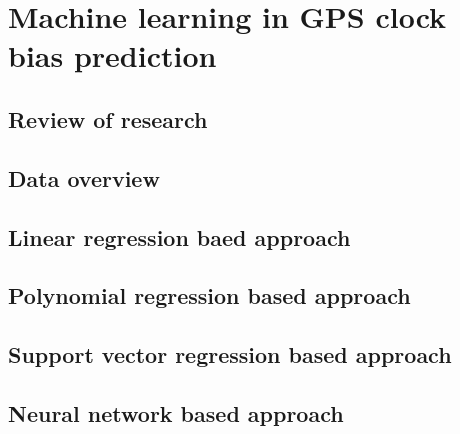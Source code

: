 \chapter{Machine learning in GPS clock bias prediction}


\section{Review of research}

\section{Data overview}

\section{Linear regression baed approach}

\section{Polynomial regression based approach}

\section{Support vector regression based approach}

\section{Neural network based approach}


